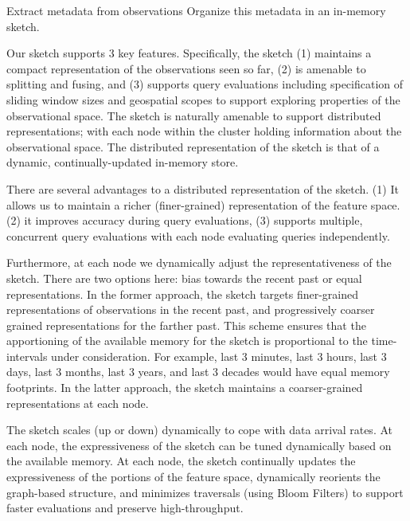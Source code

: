 Extract metadata from observations
Organize this metadata in an in-memory sketch.

Our sketch supports 3 key features. Specifically, the sketch (1) maintains a compact representation of the observations seen so far, (2) is amenable to splitting and fusing, and (3) supports query evaluations  including specification of sliding window sizes and geospatial scopes to support exploring properties of the observational space.  The sketch is naturally amenable to support distributed representations; with each node within the cluster holding information about the observational space. The distributed representation of the sketch is that of a dynamic, continually-updated in-memory store.

There are several advantages to a distributed representation of the sketch. (1) It allows us to maintain a richer (finer-grained) representation  of the feature space. (2) it improves accuracy during query evaluations, (3) supports multiple, concurrent query evaluations with each node evaluating queries independently.

Furthermore, at each node we dynamically adjust the representativeness of the sketch. There are two options here: bias towards the recent past or equal representations. In the former approach, the sketch targets finer-grained representations of observations in the recent past, and progressively coarser grained representations for the farther past. This scheme ensures that the apportioning of the available memory for the sketch is proportional to the time-intervals under consideration. For example, last 3 minutes, last 3 hours, last 3 days, last 3 months, last 3 years, and last 3 decades would have equal memory footprints.  In the latter approach, the sketch maintains a coarser-grained representations at each node.

The sketch scales (up or down) dynamically to cope with data arrival rates. At each node, the expressiveness of the sketch can be tuned dynamically based on the available memory. At each node, the sketch continually updates the expressiveness of the portions of the feature space, dynamically reorients the graph-based structure, and minimizes traversals (using Bloom Filters) to support faster evaluations and preserve high-throughput. 

